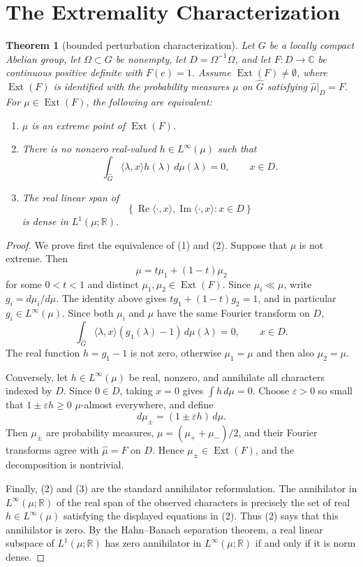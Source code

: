 \documentclass[11pt]{article}
\newtheorem{theorem}{Theorem}
\DeclareMathOperator{\Ext}{Ext}
\begin{document}
\section*{The Extremality Characterization}

\begin{theorem}[bounded perturbation characterization]
\label{lem:criterion}
Let \(G\) be a locally compact Abelian group, let \(\Omega\subset G\) be nonempty, let \(D=\Omega^{-1}\Omega\), and let \(F:D\to\mathbb C\) be continuous positive definite with \(F(e)=1\). Assume \(\Ext(F)\neq\emptyset\), where \(\Ext(F)\) is identified with the probability measures \(\mu\) on \(\widehat G\) satisfying \(\widehat\mu|_D=F\). For \(\mu\in\Ext(F)\), the following are equivalent:
\begin{enumerate}
\item \(\mu\) is an extreme point of \(\Ext(F)\).
\item There is no nonzero real-valued \(h\in L^\infty(\mu)\) such that
\[
  \int_{\widehat G} \langle \lambda,x\rangle h(\lambda)\,d\mu(\lambda)=0,
  \qquad x\in D.
\]
\item The real linear span of
\[
  \left\{\operatorname{Re}\langle \cdot,x\rangle,\operatorname{Im}\langle \cdot,x\rangle : x\in D\right\}
\]
is dense in \(L^1(\mu;\mathbb R)\).
\end{enumerate}
\end{theorem}

\begin{proof}
We prove first the equivalence of (1) and (2). Suppose that \(\mu\) is not extreme. Then
\[
  \mu=t\mu_1+(1-t)\mu_2
\]
for some \(0<t<1\) and distinct \(\mu_1,\mu_2\in\Ext(F)\). Since \(\mu_i\ll\mu\), write \(g_i=d\mu_i/d\mu\). The identity above gives \(tg_1+(1-t)g_2=1\), and in particular \(g_i\in L^\infty(\mu)\). Since both \(\mu_i\) and \(\mu\) have the same Fourier transform on \(D\),
\[
  \int_{\widehat G}\langle \lambda,x\rangle(g_1(\lambda)-1)\,d\mu(\lambda)=0,
  \qquad x\in D.
\]
The real function \(h=g_1-1\) is not zero, otherwise \(\mu_1=\mu\) and then also \(\mu_2=\mu\).

Conversely, let \(h\in L^\infty(\mu)\) be real, nonzero, and annihilate all characters indexed by \(D\). Since \(0\in D\), taking \(x=0\) gives \(\int h\,d\mu=0\). Choose \(\varepsilon>0\) so small that \(1\pm \varepsilon h\ge 0\) \(\mu\)-almost everywhere, and define
\[
  d\mu_\pm=(1\pm \varepsilon h)\,d\mu.
\]
Then \(\mu_\pm\) are probability measures, \(\mu=(\mu_++\mu_-)/2\), and their Fourier transforms agree with \(\widehat\mu=F\) on \(D\). Hence \(\mu_\pm\in\Ext(F)\), and the decomposition is nontrivial.

Finally, (2) and (3) are the standard annihilator reformulation. The annihilator in \(L^\infty(\mu;\mathbb R)\) of the real span of the observed characters is precisely the set of real \(h\in L^\infty(\mu)\) satisfying the displayed equations in (2). Thus (2) says that this annihilator is zero. By the Hahn--Banach separation theorem, a real linear subspace of \(L^1(\mu;\mathbb R)\) has zero annihilator in \(L^\infty(\mu;\mathbb R)\) if and only if it is norm dense.
\end{proof}
\end{document}
